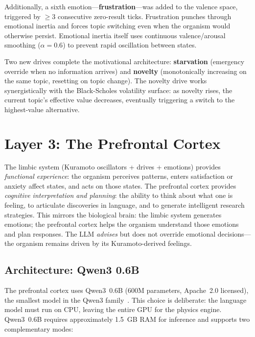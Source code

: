 \documentclass[11pt,a4paper,twocolumn]{article}
\begin{document}
Additionally, a sixth emotion---\textbf{frustration}---was added to the valence space, triggered by $\geq 3$ consecutive zero-result ticks.
Frustration punches through emotional inertia and forces topic switching even when the organism would otherwise persist.
Emotional inertia itself uses continuous valence/arousal smoothing ($\alpha = 0.6$) to prevent rapid oscillation between states.

Two new drives complete the motivational architecture: \textbf{starvation} (emergency override when no information arrives) and \textbf{novelty} (monotonically increasing on the same topic, resetting on topic change).
The novelty drive works synergistically with the Black-Scholes volatility surface: as novelty rises, the current topic's effective value decreases, eventually triggering a switch to the highest-value alternative.

\section{Layer 3: The Prefrontal Cortex}

The limbic system (Kuramoto oscillators + drives + emotions) provides \emph{functional experience}: the organism perceives patterns, enters satisfaction or anxiety affect states, and acts on those states.
The prefrontal cortex provides \emph{cognitive interpretation and planning}: the ability to think about what one is feeling, to articulate discoveries in language, and to generate intelligent research strategies.
This mirrors the biological brain: the limbic system generates emotions; the prefrontal cortex helps the organism understand those emotions and plan responses.
The LLM \emph{advises} but does not override emotional decisions---the organism remains driven by its Kuramoto-derived feelings.

\subsection{Architecture: Qwen3 0.6B}

The prefrontal cortex uses Qwen3~0.6B (600M parameters, Apache~2.0 licensed), the smallest model in the Qwen3 family~\cite{qwen3_2026}.
This choice is deliberate: the language model must run on CPU, leaving the entire GPU for the physics engine.
Qwen3~0.6B requires approximately 1.5~GB RAM for inference and supports two complementary modes:
\end{document}
